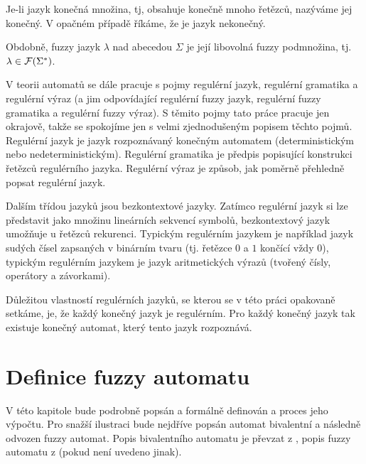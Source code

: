 Je-li jazyk konečná množina, tj, obsahuje konečně mnoho řetězců, nazýváme jej konečný. V opačném případě říkáme, že je jazyk nekonečný.

Obdobně, fuzzy jazyk $\lambda$ nad abecedou $\Sigma$ je její libovolná fuzzy podmnožina, tj. $\lambda \in \mathcal{F}(\Sigma^*)$.

\begin{note} \label{note:RegLangsExprsGrams}
 V teorii automatů se dále pracuje s pojmy regulérní jazyk, regulérní gramatika a regulérní výraz (a jim odpovídající regulérní fuzzy jazyk, regulérní fuzzy gramatika a regulérní fuzzy výraz). S těmito pojmy tato práce pracuje jen okrajově, takže se spokojíme jen s velmi zjednodušeným popisem těchto pojmů. Regulérní jazyk je jazyk rozpoznávaný konečným  automatem (deterministickým nebo nedeterministickým). Regulérní gramatika je předpis popisující konstrukci řetězců regulérního jazyka. Regulérní výraz je způsob, jak poměrně přehledně popsat regulérní jazyk.
 
 Dalším třídou jazyků jsou bezkontextové jazyky. Zatímco regulérní jazyk si lze představit jako množinu lineárních sekvencí symbolů, bezkontextový jazyk umožňuje u řetězců rekurenci. Typickým regulérním jazykem je například jazyk sudých čísel zapsaných v binárním tvaru (tj. řetězce $0$ a $1$ končící vždy $0$), typickým regulérním jazykem je jazyk aritmetických výrazů (tvořený čísly, operátory a závorkami).
 
 Důležitou vlastností regulérních jazyků, se kterou se v této práci opakovaně setkáme, je, že každý konečný jazyk je regulérním. Pro každý konečný jazyk tak existuje konečný  automat, který tento jazyk rozpoznává.
\end{note}


\section{Definice fuzzy automatu}
V této kapitole bude podrobně popsán a formálně definován  a proces jeho výpočtu. Pro snažší ilustraci bude nejdříve popsán automat bivalentní a následně odvozen fuzzy automat. Popis bivalentního automatu je převzat z \cite{HopUl-IntrAutTheLangComp}, popis fuzzy automatu z \cite{GonGar-FuzzLangInfRanAccGuzzAutPumLemDetProc} (pokud není uvedeno jinak).

